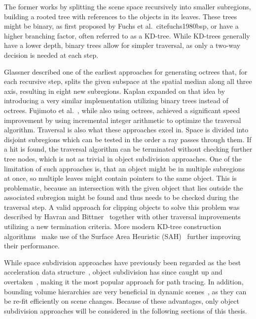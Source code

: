 The former works by splitting the scene space recursively into smaller subregions, building a rooted tree with references to the objects in its leaves. These trees might be binary, as first proposed by Fuchs et al.~cite{fuchs1980bsp}, or have a higher branching factor, often referred to as a KD-tree. While KD-trees generally have a lower depth, binary trees allow for simpler traversal, as only a two-way decision is needed at each step. 

Glassner\cite{glassner_space_1984} described one of the earliest approaches for generating octrees that, for each recursive step, splits the given subspace at the spatial median along all three axis, resulting in eight new subregions. Kaplan\cite{kaplan_use_1985} expanded on that idea by introducing a very similar implementation utilizing binary trees instead of octrees. Fujimoto et al.~\cite{fujimoto_arts_1986}, while also using octrees, achieved a significant speed improvement by using incremental integer arithmetic to optimize the traversal algorithm. Traversal is also what these approaches excel in. Space is divided into disjoint subregions which can be tested in the order a ray passes through them. If a hit is found, the traversal algorithm can be terminated without checking further tree nodes, which is not as trivial in object subdivision approaches. One of the limitation of such approaches is, that an object might be in multiple subregions at once, so multiple leaves might contain pointers to the same object. This is problematic, because an intersection with the given object that lies outside the associated subregion might be found and thus needs to be checked during the traversal step. A valid approach for clipping objects to solve this problem was described by Havran and Bittner~\cite{Havran02onimproving} together with other traversal improvements utilizing a new termination criteria. More modern KD-tree construction algorithms~\cite{roccia2012kdtree,choi2010sahKdTree,wu2011sahKdTree} make use of the Surface Area Heuristic (SAH)~\cite{MacDonald2005HeuristicsFR} further improving their performance.

While space subdivision approaches have previously been regarded as the best acceleration data structure~\cite{havrand2000comparison}, object subdivision has since caught up and overtaken~\cite{vinkler2015comparison}, making it the most popular approach for path tracing. In addition, bounding volume hierarchies are very beneficial in dynamic scenes~\cite{wald_ray_2007}, as they can be re-fit efficiently on scene changes. Because of these advantages, only object subdivision approaches will be considered in the following sections of this thesis. 


